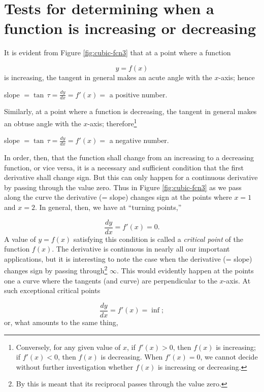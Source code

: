 \section{Tests for determining when a function is increasing or decreasing}
\label{sec:81}

It is evident from Figure \ref{fig:cubic-fcn3} that at a point where a function

\[
    y = f(x)
\]
is increasing, the tangent in general makes an acute angle with the 
$x$-axis; hence

\begin{center}
    slope $= \tan\, \tau = \frac{dy}{dx} = f'(x) =$ a positive number.
\end{center}
Similarly, at a point where a function is decreasing, the 
tangent in general makes an obtuse angle with the $x$-axis; 
therefore\footnote{Conversely, for any given value of $x$, if 
$f'(x) >0$, then $f(x)$ is increasing; if $f'(x) < 0$, then 
$f(x)$ is decreasing. When $f'(x) = 0$, we cannot decide without 
further investigation whether $f(x)$ is increasing or decreasing.}

\begin{center}
    slope $= \tan\, \tau = \frac{dy}{dx} = f'(x) =$ a negative number.
\end{center}
In order, then, that the function shall change from an increasing 
to a decreasing function, or vice versa, it is a necessary and 
sufficient condition that the first derivative shall change 
sign. But this can only happen for a continuous derivative by 
passing through the value zero. Thus in Figure \ref{fig:cubic-fcn3}
as we pass along the curve the derivative (= slope) changes sign 
at the points where $x=1$ and $x=2$. In general, then, we 
have at ``turning points,''

\[
\frac{dy}{dx} = f'(x) = 0. 
\]
A value of $y=f(x)$ satisfying this condition is called a 
{\it critical point} of the function $f(x)$. %
The derivative is continuous in nearly all our important 
applications, but it is interesting to note the case when the derivative 
(= slope) changes sign by passing through\footnote{By this is meant 
that its reciprocal passes through the value zero.} $\infty$. 
This would evidently happen at the points one a curve where the 
tangents (and curve) are perpendicular to the $x$-axis. At such 
exceptional critical points %

\[
    \frac{dy}{dx} = f'(x) = \inf;
\]
or, what amounts to the same thing,

